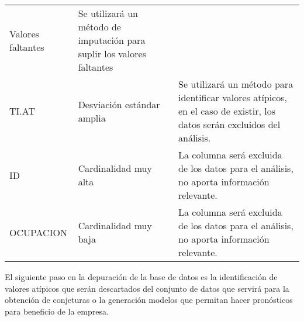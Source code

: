 \documentclass[]{book}
\begin{document}
\begin{longtable}[]{@{}lll@{}}
\begin{minipage}[t]{0.11\columnwidth}
Valores faltantes\strut
\end{minipage} & \begin{minipage}[t]{0.75\columnwidth}\raggedright\strut
Se utilizará un método de imputación para suplir los valores
faltantes\strut
\end{minipage}\tabularnewline
\begin{minipage}[t]{0.05\columnwidth}\raggedright\strut
TI.AT\strut
\end{minipage} & \begin{minipage}[t]{0.11\columnwidth}\raggedright\strut
Desviación estándar amplia\strut
\end{minipage} & \begin{minipage}[t]{0.75\columnwidth}\raggedright\strut
Se utilizará un método para identificar valores atípicos, en el caso de
existir, los datos serán excluidos del análisis.\strut
\end{minipage}\tabularnewline
\begin{minipage}[t]{0.05\columnwidth}\raggedright\strut
ID\strut
\end{minipage} & \begin{minipage}[t]{0.11\columnwidth}\raggedright\strut
Cardinalidad muy alta\strut
\end{minipage} & \begin{minipage}[t]{0.75\columnwidth}\raggedright\strut
La columna será excluida de los datos para el análisis, no aporta
información relevante.\strut
\end{minipage}\tabularnewline
\begin{minipage}[t]{0.05\columnwidth}\raggedright\strut
OCUPACION\strut
\end{minipage} & \begin{minipage}[t]{0.11\columnwidth}\raggedright\strut
Cardinalidad muy baja\strut
\end{minipage} & \begin{minipage}[t]{0.75\columnwidth}\raggedright\strut
La columna será excluida de los datos para el análisis, no aporta
información relevante.\strut
\end{minipage}\tabularnewline
\bottomrule
\end{longtable}

El siguiente paso en la depuración de la base de datos es la
identificación de valores atípicos que serán descartados del conjunto de
datos que servirá para la obtención de conjeturas o la generación
modelos que permitan hacer pronósticos para beneficio de la empresa.
\end{document}
